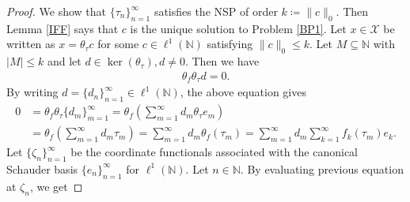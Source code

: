 \documentclass[10pt,a4paper]{amsart}
\begin{document}
\begin{proof}
We show that $\{\tau_n \}_{n=1}^\infty$ satisfies the  NSP of order $k\coloneqq \|c\|_0$. Then Lemma \ref{IFF} says that $c$ is the unique solution to Problem \ref{BP1}. Let  $x \in \mathcal{X}$  be written as  $	x=\theta_\tau c$ for some  $c \in \ell^1(\mathbb{N})$ satisfying $\|c\|_0\leq k$. Let $ M \subseteq \mathbb{N} $ with $|M|\leq k$ and let $d \in \ker(\theta_\tau), d \neq 0$. Then we have 
\begin{align*}
	\theta_f\theta_\tau d=0.
\end{align*}
By writing  $d=\{d_n\}_{n=1}^\infty\in \ell^1(\mathbb{N})$, the above equation gives 
\begin{align*}
0&=\theta_f\theta_\tau\{d_m\}_{m=1}^\infty=\theta_f\left(\sum_{m=1}^{\infty}d_m\theta_\tau e_m\right)\\
&=\theta_f\left(\sum_{m=1}^{\infty}d_m\tau_m\right)=
\sum_{m=1}^{\infty}d_m\theta_f(\tau_m)=\sum_{m=1}^{\infty}d_m\sum_{k=1}^{\infty}f_k(\tau_m)e_k.
\end{align*}
Let $\{\zeta_n \}_{n=1}^\infty$ be the coordinate functionals associated with the canonical Schauder basis  $\{e_n \}_{n=1}^\infty$ for   $\ell^1(\mathbb{N})$. Let $n \in \mathbb{N} $. By evaluating previous equation at $\zeta_n$, we get 


\end{proof}
\end{document}
